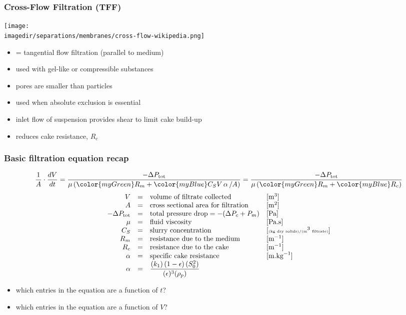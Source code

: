 \begin{frame}\frametitle{Cross-Flow Filtration (TFF)}
	\begin{center}
		\texttt{[image: \\imagedir/separations/membranes/cross-flow-wikipedia.png]}
	\end{center}
	\begin{itemize}
		\item	{\color{purple}{TFF}} = tangential flow filtration (parallel to medium)
		\item	used with gel-like or compressible substances
		\item	pores are smaller than particles
		\item	used when absolute exclusion is essential
		\item	inlet flow of suspension provides shear to limit cake build-up
		\item	reduces cake resistance, $R_c$
	\end{itemize}
\end{frame}

\begin{frame}\frametitle{Basic filtration equation recap}
	\[\dfrac{1}{A} \cdot \dfrac{dV}{dt} = \dfrac{-\Delta P_\text{tot}}{\mu \left({\color{myGreen}R_m} + {\color{myBlue}C_S V  \, \mathbf{ \alpha}\, / A} \right)} =  \dfrac{-\Delta P_\text{tot}}{\mu \left({\color{myGreen}R_m} + {\color{myBlue}R_c} \right)}
	\]
	\vspace{12pt}
	\[
		\begin{array}{rcll}
			V		&=& \text{volume of filtrate collected} 		&[\text{m}^3]\\
			A		&=& \text{cross sectional area for filtration}  &[\text{m}^2]\\
			-\Delta P_\text{tot}	&=& \text{total pressure drop} = -(\Delta P_c + P_m)	&[\text{Pa}]\\
			\mu 	&=& \text{fluid viscosity}  					&[\text{Pa.s}]\\
			C_S  	&=& \text{slurry concentration}					&[{\tiny \text{(kg dry solids)/(m}^{3}\text{ filtrate)}}]\\			
			R_m  &=& \text{resistance due to the medium}			&[\text{m}^{-1}]\\
			R_c  &=& \text{resistance due to the cake}				&[\text{m}^{-1}]\\
			\alpha	&=& \text{specific cake resistance} 			&[\text{m.kg}^{-1}]\\
			\alpha  &=& \dfrac{(k_1) \left(1-\epsilon\right) (S_0^2)}{(\epsilon)^3 (\rho_p)}
		\end{array}
	\]
	\begin{itemize}
		\item	which entries in the equation are a function of $t$?
		\item	which entries in the equation are a function of $V$?
	\end{itemize}
\end{frame}

